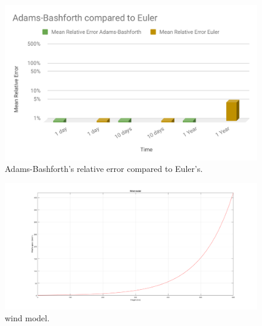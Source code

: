 \documentclass[10pt,a4paper]{article}
\begin{document}
	\begin{figure}[h]
		\centering
		\includegraphics[width=1\linewidth]{Adams_Bashforth_compared_to_Euler.pdf}
		\caption[Short]{Adams-Bashforth's relative error compared to Euler's.}
		\label{fig:adams-bashforth}
	\end{figure}
	
	
	\begin{figure}[h]
		\centering
		\includegraphics[width=1\linewidth]{wind_model.png}
		\caption[Short]{wind model.}
		\label{fig:wind}
	\end{figure}      
	
\end{document}
